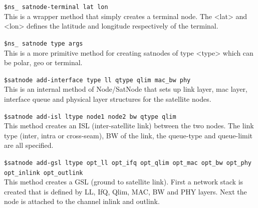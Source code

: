 \begin{flushleft}
{\tt \$ns\_ satnode-terminal \<lat\> \<lon\>}\\
This is a wrapper method that simply creates a terminal node. The <lat>
and <lon> defines the latitude and longitude respectively of the terminal.


{\tt \$ns\_ satnode \<type\> \<args\>}\\
This is a more primitive method for creating satnodes of type <type>
which can be polar, geo or terminal. 


{\tt \$satnode add-interface \<type\> \<ll\> \<qtype\> \<qlim\> \<mac\_bw\> \<phy\>}\\
This is an internal method of Node/SatNode that sets up link layer, mac
layer, interface queue and physical layer structures for the satellite
nodes.


{\tt \$satnode add-isl \<ltype\> \<node1\> \<node2\> \<bw\> \<qtype\> \<qlim\>}\\
This method creates an ISL (inter-satellite link) between the two nodes.
The link type (inter, intra or cross-seam), BW of the link, the queue-type
and queue-limit are all specified.


{\tt \$satnode add-gsl \<ltype\> \<opt\_ll\> \<opt\_ifq\> \<opt\_qlim\> \<opt\_mac\> \<opt\_bw\> \<opt\_phy\> \<opt\_inlink\> \<opt\_outlink\>}\\
This method creates a GSL (ground to satellite link). First a network
stack is created that is defined by LL, IfQ, Qlim, MAC, BW and PHY layers.
Next the node is attached to the channel inlink and outlink.


\end{flushleft}

\endinput


